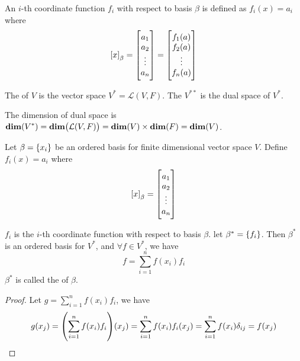 \begin{definition}
	An $i$-th coordinate function $f_i$ with respect to basis $\beta$ is defined as $f_i(x) = a_i$ where
	\begin{equation*}
		\coordinate{x}_\beta = \begin{bmatrix}
			a_1 \\
			a_2 \\
			\vdots \\
			a_n
		\end{bmatrix} = \begin{bmatrix}
			f_1(a) \\
			f_2(a) \\
			\vdots \\
			f_n(a)
		\end{bmatrix}
	\end{equation*}
\end{definition}



\begin{definition}
	The \label{dualspacedefinition} of $V$ is the vector space $V^* = \mathcal{L}(V,F)$. The  $V^{**}$ is the dual space of $V^*$.
\end{definition}


The dimension of dual space is $\dimension{V^*} = \dimension{\mathcal{L}(V,F)} = \dimension{V} \times \dimension{F} = \dimension{V}$.

\begin{definition}
	Let $\beta = \set{x_i}$ be an ordered basis for finite dimensional vector space $V$. Define $f_i (x) = a_i$ where
	\begin{equation*}
	    \coordinate{x}_\beta = \begin{bmatrix}
	        a_1 \\
	        a_2 \\
	        \vdots \\
	        a_n
	    \end{bmatrix}
	\end{equation*}
	
	$f_i$ is the $i$-th coordinate function with respect to basis $\beta$. let $\beta^*=\set{f_i}$. Then $\beta^*$ is an ordered basis for $V^*$, and $\forall f \in V^*$, we have
	\begin{equation}
		f = \sum_{i=1}^n f(x_i) f_i
	\end{equation}
	$\beta^*$ is called the  of $\beta$.
\end{definition}
\begin{proof}
	Let $g =\displaystyle \sum_{i=1}^n f(x_i) f_i$, we have
	\begin{equation*}
	g(x_j) = \mleft( \sum_{i=1}^n f(x_i) f_i \mright) (x_j) = \sum_{i=1}^n f(x_i) f_i (x_j) = \sum_{i=1}^n f(x_i) \delta_{ij} =f(x_j)
	\end{equation*}
\end{proof}



